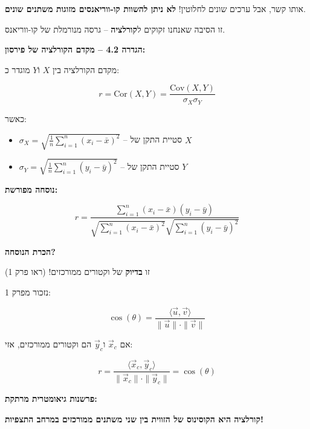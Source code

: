 אותו קשר, אבל ערכים שונים לחלוטין! \textbf{לא ניתן להשוות קו-ווריאנסים מזוגות משתנים שונים}.

זו הסיבה שאנחנו זקוקים ל\textbf{קורלציה} – גרסה מנורמלת של קו-ווריאנס.


\textbf{הגדרה \num{4.2} – מקדם הקורלציה של פירסון:}

מקדם הקורלציה בין $X$ ו\en{-}$Y$ מוגדר כ:

\begin{equation}
r = \text{Cor}(X, Y) = \frac{\text{Cov}(X, Y)}{\sigma_X \sigma_Y}
\end{equation}

כאשר:
\begin{itemize}
\item $\sigma_X = \sqrt{\frac{1}{n}\sum_{i=1}^{n}(x_i - \bar{x})^2}$ – סטיית התקן של $X$
\item $\sigma_Y = \sqrt{\frac{1}{n}\sum_{i=1}^{n}(y_i - \bar{y})^2}$ – סטיית התקן של $Y$
\end{itemize}

\textbf{נוסחה מפורשת:}

\begin{equation}
r = \frac{\sum_{i=1}^{n}(x_i - \bar{x})(y_i - \bar{y})}{\sqrt{\sum_{i=1}^{n}(x_i - \bar{x})^2} \sqrt{\sum_{i=1}^{n}(y_i - \bar{y})^2}}
\end{equation}

\textbf{הכרת הנוסחה?}

זו \textbf{בדיוק } של וקטורים ממורכזים! (ראו פרק \num{1})


נזכור מפרק \num{1}:

\begin{equation}
\cos(\theta) = \frac{\langle \vec{u}, \vec{v} \rangle}{\|\vec{u}\| \cdot \|\vec{v}\|}
\end{equation}

אם $\vec{x}_c$ ו\en{-}$\vec{y}_c$ הם וקטורים ממורכזים, אזי:

\begin{equation}
r = \frac{\langle \vec{x}_c, \vec{y}_c \rangle}{\|\vec{x}_c\| \cdot \|\vec{y}_c\|} = \cos(\theta)
\end{equation}

\textbf{פרשנות גיאומטרית מרתקת:}

\textbf{קורלציה היא הקוסינוס של הזווית בין שני משתנים ממורכזים במרחב התצפיות!}

